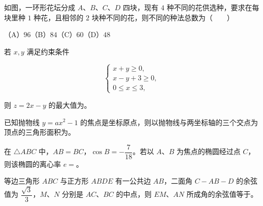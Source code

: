 \begin{question}
如图，一环形花坛分成 $A\text{、}B\text{、}C\text{、}D$ 四块，现有 $4$ 种不同的花供选种，要求在每块里种 $1$ 种花，且相邻的 $2$ 块种不同的花，则不同的种法总数为\mbox{（　　）}
\nopagebreak[4]
\begin{center}\end{center}
\nopagebreak[4]
（A）$96$\quad（B）$84$\quad（C）$60$\quad（D）$48$

\end{question}

\begin{question}
若 $x,y$ 满足约束条件

\nopagebreak[4]
\[
\begin{cases}
x+y\geqslant0,\\
x-y+3\geqslant0,\\
0\leqslant x\leqslant3,
\end{cases}
\]

则 $z=2x-y$ 的最大值为\gkblank{}。

\end{question}
\begin{question}
已知抛物线 $y=ax^2-1$ 的焦点是坐标原点，则以抛物线与两坐标轴的三个交点为顶点的三角形面积为\gkblank{}。

\end{question}
\begin{question}
在 $\triangle ABC$ 中，$AB=BC$，$\cos B=-\dfrac7{18}$。若以 $A\text{、}B$ 为焦点的椭圆经过点 $C$，则该椭圆的离心率 $e=$\gkblank{}。

\end{question}
\begin{question}
等边三角形 $ABC$ 与正方形 $ABDE$ 有一公共边 $AB$，二面角 $C-AB-D$ 的余弦值为 $\dfrac{\sqrt3}{3}$，$M\text{、}N$ 分别是 $AC\text{、}BC$ 的中点，则 $EM\text{、}AN$ 所成角的余弦值等于\gkblank{}。

\end{question}


